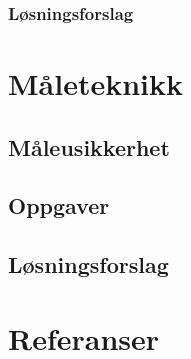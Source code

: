\documentclass[12pt]{report}
\begin{document}
\subsection{Løsningsforslag}
\printsolutions[section]




\newpage


\chapter{Måleteknikk}
\section{Måleusikkerhet}



\section{Oppgaver}

\section{Løsningsforslag}
\printsolutions[chapter]


\newpage
\chapter{Referanser}
\printbibliography[heading=none]

\appendix



\end{document}
